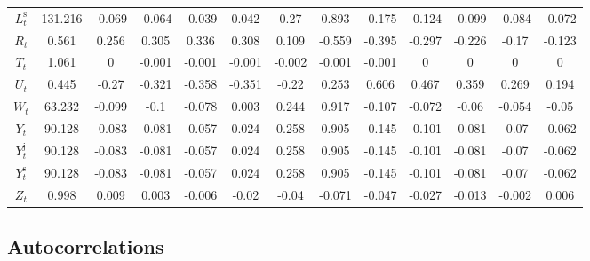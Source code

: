 \begin{tabular}{c|c|c|c|c|c|c|c|c|c|c|c|c|}
$L^{\mathrm{s}}_{t}$ & 131.216 & -0.069 & -0.064 & -0.039 & 0.042 & 0.27 & 0.893 & -0.175 & -0.124 & -0.099 & -0.084 & -0.072 \\
$R_{t}$ & 0.561 & 0.256 & 0.305 & 0.336 & 0.308 & 0.109 & -0.559 & -0.395 & -0.297 & -0.226 & -0.17 & -0.123 \\
$T_{t}$ & 1.061 & 0 & -0.001 & -0.001 & -0.001 & -0.002 & -0.001 & -0.001 & 0 & 0 & 0 & 0 \\
$U_{t}$ & 0.445 & -0.27 & -0.321 & -0.358 & -0.351 & -0.22 & 0.253 & 0.606 & 0.467 & 0.359 & 0.269 & 0.194 \\
$W_{t}$ & 63.232 & -0.099 & -0.1 & -0.078 & 0.003 & 0.244 & 0.917 & -0.107 & -0.072 & -0.06 & -0.054 & -0.05 \\
$Y_{t}$ & 90.128 & -0.083 & -0.081 & -0.057 & 0.024 & 0.258 & 0.905 & -0.145 & -0.101 & -0.081 & -0.07 & -0.062 \\
$Y^{\mathrm{j}}_{t}$ & 90.128 & -0.083 & -0.081 & -0.057 & 0.024 & 0.258 & 0.905 & -0.145 & -0.101 & -0.081 & -0.07 & -0.062 \\
$Y^{\mathrm{s}}_{t}$ & 90.128 & -0.083 & -0.081 & -0.057 & 0.024 & 0.258 & 0.905 & -0.145 & -0.101 & -0.081 & -0.07 & -0.062 \\
$Z_{t}$ & 0.998 & 0.009 & 0.003 & -0.006 & -0.02 & -0.04 & -0.071 & -0.047 & -0.027 & -0.013 & -0.002 & 0.006 \\
\hline
\end{tabular}


\subsection{Autocorrelations}

